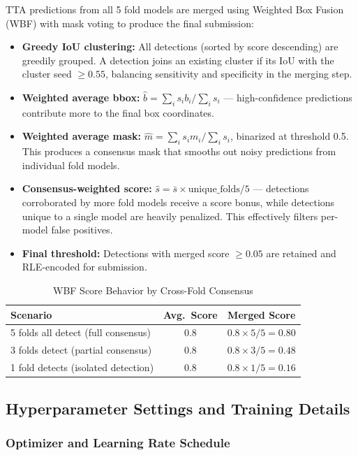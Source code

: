 \documentclass[a4paper]{article} %
\begin{document}
TTA predictions from all 5 fold models are merged using Weighted Box Fusion (WBF) with mask voting \cite{wbf} to produce the final submission:
\begin{itemize}
    \item \textbf{Greedy IoU clustering:} All detections (sorted by score descending) are greedily grouped. A detection joins an existing cluster if its IoU with the cluster seed $\geq 0.55$, balancing sensitivity and specificity in the merging step.
    \item \textbf{Weighted average bbox:} $\hat{b} = \sum_i s_i b_i / \sum_i s_i$ --- high-confidence predictions contribute more to the final box coordinates.
    \item \textbf{Weighted average mask:} $\hat{m} = \sum_i s_i m_i / \sum_i s_i$, binarized at threshold 0.5. This produces a consensus mask that smooths out noisy predictions from individual fold models.
    \item \textbf{Consensus-weighted score:} $\hat{s} = \bar{s} \times \text{unique\_folds} / 5$ --- detections corroborated by more fold models receive a score bonus, while detections unique to a single model are heavily penalized. This effectively filters per-model false positives.
    \item \textbf{Final threshold:} Detections with merged score $\geq 0.05$ are retained and RLE-encoded for submission.
\end{itemize}

\begin{table}[H]
\centering
\caption{WBF Score Behavior by Cross-Fold Consensus}
\label{tab:wbf_score}
\begin{tabular}{lcc}
\toprule
\textbf{Scenario} & \textbf{Avg.\ Score} & \textbf{Merged Score} \\
\midrule
5 folds all detect (full consensus) & 0.8 & $0.8 \times 5/5 = 0.80$ \\
3 folds detect (partial consensus)  & 0.8 & $0.8 \times 3/5 = 0.48$ \\
1 fold detects (isolated detection) & 0.8 & $0.8 \times 1/5 = 0.16$ \\
\bottomrule
\end{tabular}
\end{table}

\subsection{Hyperparameter Settings and Training Details}

\subsubsection{Optimizer and Learning Rate Schedule}
\end{document}
